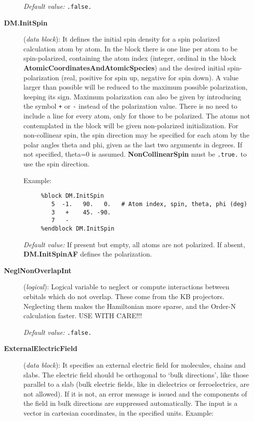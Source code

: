\begin{description}
{\it Default value:} {\tt .false.}


\item[{\bf DM.InitSpin}] ({\it data block}): 
 It defines the
initial spin density for a spin polarized calculation atom by atom.
In the block there is one line per atom to be spin-polarized, 
containing the atom index (integer, ordinal in the block
{\bf AtomicCoordinatesAndAtomicSpecies}) and the desired
initial spin-polarization (real, positive for spin up, negative for
spin down). A value larger than possible will be reduced
to the maximum possible polarization, keeping its sign. 
Maximum polarization can also be given by introducing the
symbol {\tt +} or {\tt -} instead of the polarization value.
There is no need to include a line for every atom, only for
those to be polarized. The atoms not contemplated in the block will
be given non-polarized initialization.
For non-collinear spin, the spin direction may be specified for
each atom by the polar angles theta and phi, given as the last
two arguments in degrees. If not specified, theta=0 is assumed.
{\bf NonCollinearSpin} must be {\tt .true.} to use the spin direction.

Example:

\begin{verbatim}
     %block DM.InitSpin
        5  -1.   90.   0.   # Atom index, spin, theta, phi (deg)
        3   +    45. -90.
        7   -
     %endblock DM.InitSpin
\end{verbatim}

{\it Default value:} If present but empty, all atoms are not polarized. 
If absent, {\bf DM.InitSpinAF} defines the polarization.


\item[{\bf NeglNonOverlapInt}] ({\it logical}): 
Logical variable to neglect or compute interactions between orbitals
which do not overlap. These come from the KB projectors.
Neglecting them makes the Hamiltonian more sparse, and
the Order-N calculation faster.  USE WITH CARE!!!

{\it Default value:} {\tt .false.}
        
\item[{\bf ExternalElectricField}] ({\it data block}): 
It specifies an external electric field for molecules, chains and slabs.
The electric field should be orthogonal to `bulk directions', like
those parallel to a slab (bulk electric fields, like in
dielectrics or ferroelectrics, are not allowed). If it is not, an
error message is issued and the components of the field in bulk
directions are suppressed automatically. The input is a
vector in cartesian coordinates, in the specified units. Example:


\end{description}
